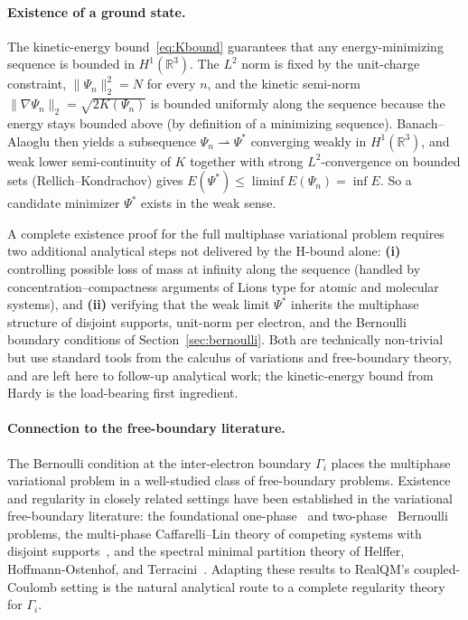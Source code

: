 \documentclass[11pt]{article}
\begin{document}
\paragraph{Existence of a ground state.}
The kinetic-energy bound~\eqref{eq:Kbound} guarantees that any energy-minimizing sequence is bounded in $H^1(\mathbb{R}^3)$. The $L^2$ norm is fixed by the unit-charge constraint, $\|\Psi_n\|_2^2 = N$ for every $n$, and the kinetic semi-norm $\|\nabla \Psi_n\|_2 = \sqrt{2K(\Psi_n)}$ is bounded uniformly along the sequence because the energy stays bounded above (by definition of a minimizing sequence). Banach--Alaoglu then yields a subsequence $\Psi_n \rightharpoonup \Psi^*$ converging weakly in $H^1(\mathbb{R}^3)$, and weak lower semi-continuity of $K$ together with strong $L^2$-convergence on bounded sets (Rellich--Kondrachov) gives $E(\Psi^*) \le \liminf E(\Psi_n) = \inf E$. So a candidate minimizer $\Psi^*$ exists in the weak sense.

A complete existence proof for the full multiphase variational problem requires two additional analytical steps not delivered by the H-bound alone: \textbf{(i)} controlling possible loss of mass at infinity along the sequence (handled by concentration--compactness arguments of Lions type for atomic and molecular systems), and \textbf{(ii)} verifying that the weak limit $\Psi^*$ inherits the multiphase structure of disjoint supports, unit-norm per electron, and the Bernoulli boundary conditions of Section~\ref{sec:bernoulli}. Both are technically non-trivial but use standard tools from the calculus of variations and free-boundary theory, and are left here to follow-up analytical work; the kinetic-energy bound from Hardy is the load-bearing first ingredient.

\paragraph{Connection to the free-boundary literature.}
The Bernoulli condition at the inter-electron boundary $\Gamma_i$ places the multiphase variational problem in a well-studied class of free-boundary problems. Existence and regularity in closely related settings have been established in the variational free-boundary literature: the foundational one-phase~\cite{AltCaffarelli81} and two-phase~\cite{AltCaffarelliFriedman84} Bernoulli problems, the multi-phase Caffarelli--Lin theory of competing systems with disjoint supports~\cite{CaffarelliLin08}, and the spectral minimal partition theory of Helffer, Hoffmann-Ostenhof, and Terracini~\cite{HHOT09}. Adapting these results to RealQM's coupled-Coulomb setting is the natural analytical route to a complete regularity theory for $\Gamma_i$.
\end{document}
